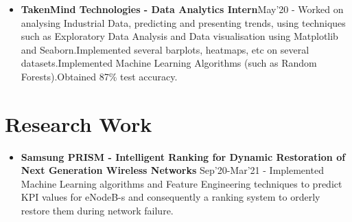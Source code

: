 \documentclass{article}
\begin{document}
\begin{itemize}
    \item{\textbf{\large{TakenMind Technologies - Data Analytics Intern}}}\hfill \textmd{May'20}
          \newline
          \textmd{- Worked on analysing Industrial Data, predicting and presenting trends, using techniques such as Exploratory Data Analysis and Data visualisation using Matplotlib and Seaborn.Implemented several barplots, heatmaps, etc on several datasets.Implemented Machine Learning Algorithms (such as Random Forests).Obtained 87\% test accuracy.}

\end{itemize}





\section*{Research Work}
\begin{itemize}
    \item{\textbf{\large{Samsung PRISM - Intelligent Ranking for Dynamic Restoration of Next Generation Wireless Networks}}} \hfill \textmd{Sep'20-Mar'21}
          \newline
          \textmd{- Implemented Machine Learning algorithms and Feature Engineering techniques to predict KPI values for eNodeB-s and consequently a ranking system to orderly restore them during network failure.}
\end{itemize}

\end{document}
